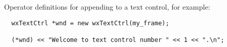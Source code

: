 



Operator definitions for appending to a text control, for example:

\begin{verbatim}
  wxTextCtrl *wnd = new wxTextCtrl(my_frame);

  (*wnd) << "Welcome to text control number " << 1 << ".\n";
\end{verbatim}


